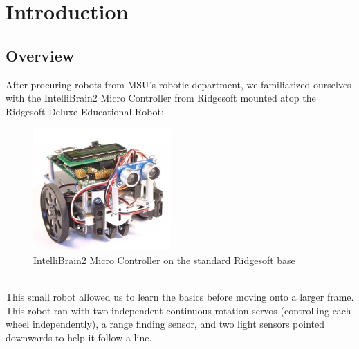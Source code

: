 \documentclass[12pt]{article}
\begin{document}
 


\onehalfspacing

\setcounter{page}{1}
\setlength{\headheight}{15pt} \pagestyle{fancyplain}
\rhead{\fancyplain{}{\small{\textit{\leftmark}}}}\cfoot{\small{\thepage}}
\section{Introduction}
\subsection{Overview}
After procuring robots from MSU's robotic department, we familiarized ourselves with the IntelliBrain2 Micro Controller from Ridgesoft mounted atop the Ridgesoft Deluxe Educational Robot:\\
\begin{figure}[h]
\centerline{\includegraphics[scale=.5]{img/smallBot}}
\caption{IntelliBrain2 Micro Controller on the standard Ridgesoft base}
\end{figure}\\
This small robot allowed us to learn the basics before moving onto a larger frame.  This robot ran with two independent continuous rotation servos (controlling each wheel independently), a range finding sensor, and two light sensors pointed downwards to help it follow a line.  
\end{document}
